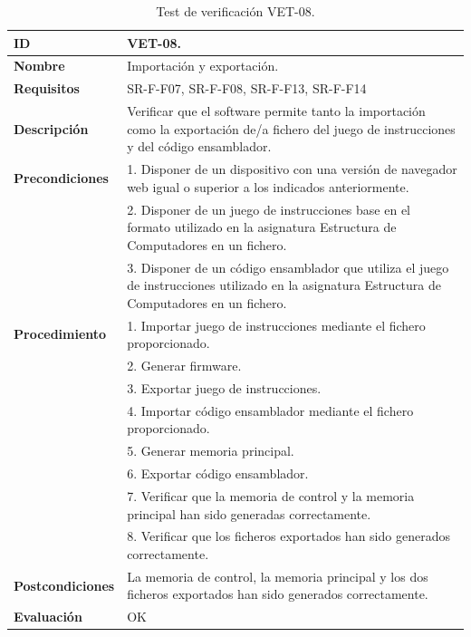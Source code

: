 \begin{center}
\begin{table}[htb]
\centering
\begin{tabular}{@{}p{2.5cm} p{13cm}@{}} 
\toprule
\textbf{ID} 					& VET-08. \\
\midrule
\textbf{Nombre} 				& Importación y exportación. \\
\midrule
\textbf{Requisitos} 		& SR-F-F07, SR-F-F08, SR-F-F13, SR-F-F14\\
\midrule
\textbf{Descripción} 		& Verificar que el software permite tanto la importación como la exportación de/a fichero del juego de instrucciones y del código ensamblador. \\
\midrule
\textbf{Precondiciones}		& 1. Disponer de un dispositivo con una versión de navegador web igual o superior a los indicados anteriormente. \\
											& 2. Disponer de un juego de instrucciones base en el formato utilizado en la asignatura Estructura de Computadores en un fichero. \\
											& 3. Disponer de un código ensamblador que utiliza el juego de instrucciones utilizado en la asignatura Estructura de Computadores en un fichero. \\
\midrule
\textbf{Procedimiento}		& 1. Importar juego de instrucciones mediante el fichero proporcionado.\\
											& 2. Generar firmware.\\
											& 3. Exportar juego de instrucciones.\\
											& 4. Importar código ensamblador mediante el fichero proporcionado.\\
											& 5. Generar memoria principal.\\
											& 6. Exportar código ensamblador.\\
											& 7. Verificar que la memoria de control y la memoria principal han sido generadas correctamente.\\
											& 8. Verificar que los ficheros exportados han sido generados correctamente.\\
\midrule
\textbf{Postcondiciones} 		&  La memoria de control, la memoria principal y los dos ficheros exportados han sido generados correctamente.\\
\midrule
\textbf{Evaluación} 			& OK \\
\bottomrule
\end{tabular}
\caption{Test de verificación VET-08.}
\label{tab:vet08}
\end{table}
\end{center}


